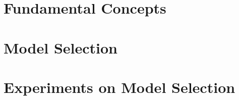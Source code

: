 \documentclass{beamer}
\begin{document}
\section{Fundamental Concepts}

\section{Model Selection}


\section{Experiments on Model Selection}
\end{document}
